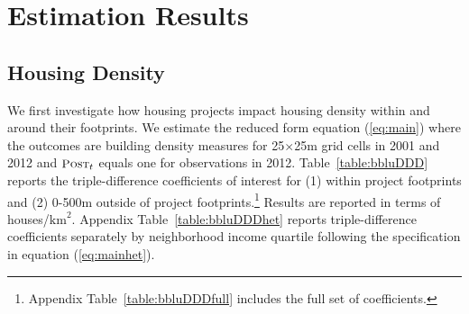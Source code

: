 \documentclass[12pt]{article}
\begin{document}




\section{Estimation Results}\label{section:results}




\subsection{Housing Density}\label{section:bbluestimates}

We first investigate how housing projects impact housing density within and around their footprints.  We estimate the reduced form equation (\ref{eq:main}) where the outcomes are building density measures for 25$\times$25m grid cells in 2001 and 2012 and $\textsc{\small Post}_{t}$ equals one for observations in 2012.  Table~\ref{table:bbluDDD} reports the triple-difference coefficients of interest for (1) within project footprints and (2) 0-500m outside of project footprints.\footnote{Appendix Table~\ref{table:bbluDDDfull} includes the full set of coefficients.}  Results are reported in terms of houses/$\text{km}^{2}$.  Appendix Table~\ref{table:bbluDDDhet} reports triple-difference coefficients separately by neighborhood income quartile following the specification in equation (\ref{eq:mainhet}).
\end{document}
